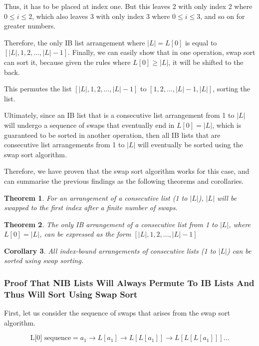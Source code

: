 \documentclass[12pt]{article}
\newtheorem{theorem}{Theorem}[section]
\newtheorem{corollary}[theorem]{Corollary} %
\begin{document}
Thus, it has to be placed at index one. But this leaves 2 with only index 2 where $0 \leq i \leq 2$, which also leaves 3 with only index 3 where $0 \leq i \leq 3$, and so on for greater numbers.

Therefore, the only IB list arrangement where $|L|=L[0]$ is equal to $[|L|, 1, 2, ..., |L|-1]$. Finally, we can easily show that in one operation, swap sort can sort it, because given the rules where $L[0] \geq |L|$, it will be shifted to the back.

This permutes the list $[|L|, 1, 2, ..., |L|-1]$ to $[1, 2, ..., |L|-1, |L|]$, sorting the list.

Ultimately, since an IB list that is a consecutive list arrangement from 1 to $|L|$ will undergo a sequence of swaps that eventually end in $L[0]=|L|$, which is guaranteed to be sorted in another operation, then all IB lists that are consecutive list arrangements from 1 to $|L|$ will eventually be sorted using the swap sort algorithm.

Therefore, we have proven that the swap sort algorithm works for this case, and can summarise the previous findings as the following theorems and corollaries.

\begin{theorem}
 For an arrangement of a consecutive list (1 to $|L|$), $|L|$ will be swapped to the first index after a finite number of swaps.
\end{theorem}

\begin{theorem}
 The only IB arrangement of a consecutive list from 1 to $|L|$, where $L[0]=|L|$, can be expressed as the form $[|L|,1,2,...,|L|-1]$
\end{theorem}

\begin{corollary}
 All index-bound arrangements of consecutive lists (1 to $|L|$) can be sorted using swap sorting.
\end{corollary}

\subsubsection{Proof That NIB Lists Will Always Permute To IB Lists And Thus Will Sort Using Swap Sort}

First, let us consider the sequence of swaps that arises from the swap sort algorithm.

\[
\text{L[0] sequence} = a_1 \rightarrow L[a_1] \rightarrow L[L[a_1]] \rightarrow L[L[L[a_1]]] \dots
\]
\end{document}
